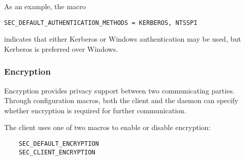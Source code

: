 As an example, the macro
\begin{verbatim}
SEC_DEFAULT_AUTHENTICATION_METHODS = KERBEROS, NTSSPI
\end{verbatim}
indicates that either Kerberos or Windows authentication may be used,
but Kerberos is preferred over Windows.


\subsubsection{\label{sec:Security-Encryption} Encryption}
Encryption provides privacy support between two communicating parties.
Through configuration macros, both the client and the daemon
can specify whether encryption is required for further communication.

The client uses one of two macros to enable or disable encryption:
\begin{verbatim}
    SEC_DEFAULT_ENCRYPTION
    SEC_CLIENT_ENCRYPTION
\end{verbatim}

